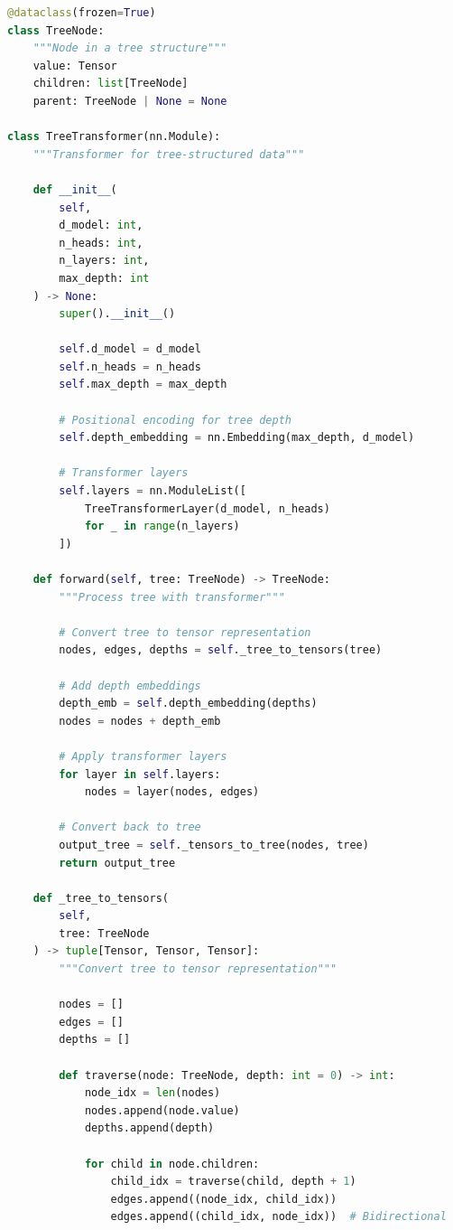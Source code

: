 \documentclass[11pt]{article}
\begin{document}
\begin{lstlisting}[language=Python, caption=Tree Transformer Implementation]
@dataclass(frozen=True)
class TreeNode:
    """Node in a tree structure"""
    value: Tensor
    children: list[TreeNode]
    parent: TreeNode | None = None

class TreeTransformer(nn.Module):
    """Transformer for tree-structured data"""
    
    def __init__(
        self,
        d_model: int,
        n_heads: int,
        n_layers: int,
        max_depth: int
    ) -> None:
        super().__init__()
        
        self.d_model = d_model
        self.n_heads = n_heads
        self.max_depth = max_depth
        
        # Positional encoding for tree depth
        self.depth_embedding = nn.Embedding(max_depth, d_model)
        
        # Transformer layers
        self.layers = nn.ModuleList([
            TreeTransformerLayer(d_model, n_heads)
            for _ in range(n_layers)
        ])
        
    def forward(self, tree: TreeNode) -> TreeNode:
        """Process tree with transformer"""
        
        # Convert tree to tensor representation
        nodes, edges, depths = self._tree_to_tensors(tree)
        
        # Add depth embeddings
        depth_emb = self.depth_embedding(depths)
        nodes = nodes + depth_emb
        
        # Apply transformer layers
        for layer in self.layers:
            nodes = layer(nodes, edges)
        
        # Convert back to tree
        output_tree = self._tensors_to_tree(nodes, tree)
        return output_tree
    
    def _tree_to_tensors(
        self, 
        tree: TreeNode
    ) -> tuple[Tensor, Tensor, Tensor]:
        """Convert tree to tensor representation"""
        
        nodes = []
        edges = []
        depths = []
        
        def traverse(node: TreeNode, depth: int = 0) -> int:
            node_idx = len(nodes)
            nodes.append(node.value)
            depths.append(depth)
            
            for child in node.children:
                child_idx = traverse(child, depth + 1)
                edges.append((node_idx, child_idx))
                edges.append((child_idx, node_idx))  # Bidirectional
            

\end{lstlisting}
\end{document}
